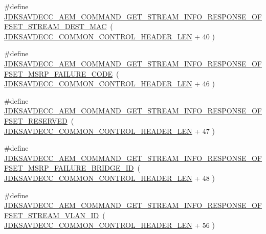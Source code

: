 \begin{DoxyCompactItemize}
\item 
\#define \hyperlink{group__command__get__stream__info__response_ga528cdca96c4e91ae32e28c1af63241d6}{J\+D\+K\+S\+A\+V\+D\+E\+C\+C\+\_\+\+A\+E\+M\+\_\+\+C\+O\+M\+M\+A\+N\+D\+\_\+\+G\+E\+T\+\_\+\+S\+T\+R\+E\+A\+M\+\_\+\+I\+N\+F\+O\+\_\+\+R\+E\+S\+P\+O\+N\+S\+E\+\_\+\+O\+F\+F\+S\+E\+T\+\_\+\+S\+T\+R\+E\+A\+M\+\_\+\+D\+E\+S\+T\+\_\+\+M\+AC}~( \hyperlink{group__jdksavdecc__avtp__common__control__header_gaae84052886fb1bb42f3bc5f85b741dff}{J\+D\+K\+S\+A\+V\+D\+E\+C\+C\+\_\+\+C\+O\+M\+M\+O\+N\+\_\+\+C\+O\+N\+T\+R\+O\+L\+\_\+\+H\+E\+A\+D\+E\+R\+\_\+\+L\+EN} + 40 )
\item 
\#define \hyperlink{group__command__get__stream__info__response_ga667be167903eabb30e41fc1fddc97286}{J\+D\+K\+S\+A\+V\+D\+E\+C\+C\+\_\+\+A\+E\+M\+\_\+\+C\+O\+M\+M\+A\+N\+D\+\_\+\+G\+E\+T\+\_\+\+S\+T\+R\+E\+A\+M\+\_\+\+I\+N\+F\+O\+\_\+\+R\+E\+S\+P\+O\+N\+S\+E\+\_\+\+O\+F\+F\+S\+E\+T\+\_\+\+M\+S\+R\+P\+\_\+\+F\+A\+I\+L\+U\+R\+E\+\_\+\+C\+O\+DE}~( \hyperlink{group__jdksavdecc__avtp__common__control__header_gaae84052886fb1bb42f3bc5f85b741dff}{J\+D\+K\+S\+A\+V\+D\+E\+C\+C\+\_\+\+C\+O\+M\+M\+O\+N\+\_\+\+C\+O\+N\+T\+R\+O\+L\+\_\+\+H\+E\+A\+D\+E\+R\+\_\+\+L\+EN} + 46 )
\item 
\#define \hyperlink{group__command__get__stream__info__response_ga51ea9061eca6e1643e563f93886b36dd}{J\+D\+K\+S\+A\+V\+D\+E\+C\+C\+\_\+\+A\+E\+M\+\_\+\+C\+O\+M\+M\+A\+N\+D\+\_\+\+G\+E\+T\+\_\+\+S\+T\+R\+E\+A\+M\+\_\+\+I\+N\+F\+O\+\_\+\+R\+E\+S\+P\+O\+N\+S\+E\+\_\+\+O\+F\+F\+S\+E\+T\+\_\+\+R\+E\+S\+E\+R\+V\+ED}~( \hyperlink{group__jdksavdecc__avtp__common__control__header_gaae84052886fb1bb42f3bc5f85b741dff}{J\+D\+K\+S\+A\+V\+D\+E\+C\+C\+\_\+\+C\+O\+M\+M\+O\+N\+\_\+\+C\+O\+N\+T\+R\+O\+L\+\_\+\+H\+E\+A\+D\+E\+R\+\_\+\+L\+EN} + 47 )
\item 
\#define \hyperlink{group__command__get__stream__info__response_ga570c77ad8adcdfea8c98400212e890a6}{J\+D\+K\+S\+A\+V\+D\+E\+C\+C\+\_\+\+A\+E\+M\+\_\+\+C\+O\+M\+M\+A\+N\+D\+\_\+\+G\+E\+T\+\_\+\+S\+T\+R\+E\+A\+M\+\_\+\+I\+N\+F\+O\+\_\+\+R\+E\+S\+P\+O\+N\+S\+E\+\_\+\+O\+F\+F\+S\+E\+T\+\_\+\+M\+S\+R\+P\+\_\+\+F\+A\+I\+L\+U\+R\+E\+\_\+\+B\+R\+I\+D\+G\+E\+\_\+\+ID}~( \hyperlink{group__jdksavdecc__avtp__common__control__header_gaae84052886fb1bb42f3bc5f85b741dff}{J\+D\+K\+S\+A\+V\+D\+E\+C\+C\+\_\+\+C\+O\+M\+M\+O\+N\+\_\+\+C\+O\+N\+T\+R\+O\+L\+\_\+\+H\+E\+A\+D\+E\+R\+\_\+\+L\+EN} + 48 )
\item 
\#define \hyperlink{group__command__get__stream__info__response_ga76800c5a9f4c6c55e4506d5713822326}{J\+D\+K\+S\+A\+V\+D\+E\+C\+C\+\_\+\+A\+E\+M\+\_\+\+C\+O\+M\+M\+A\+N\+D\+\_\+\+G\+E\+T\+\_\+\+S\+T\+R\+E\+A\+M\+\_\+\+I\+N\+F\+O\+\_\+\+R\+E\+S\+P\+O\+N\+S\+E\+\_\+\+O\+F\+F\+S\+E\+T\+\_\+\+S\+T\+R\+E\+A\+M\+\_\+\+V\+L\+A\+N\+\_\+\+ID}~( \hyperlink{group__jdksavdecc__avtp__common__control__header_gaae84052886fb1bb42f3bc5f85b741dff}{J\+D\+K\+S\+A\+V\+D\+E\+C\+C\+\_\+\+C\+O\+M\+M\+O\+N\+\_\+\+C\+O\+N\+T\+R\+O\+L\+\_\+\+H\+E\+A\+D\+E\+R\+\_\+\+L\+EN} + 56 )

\end{DoxyCompactItemize}
